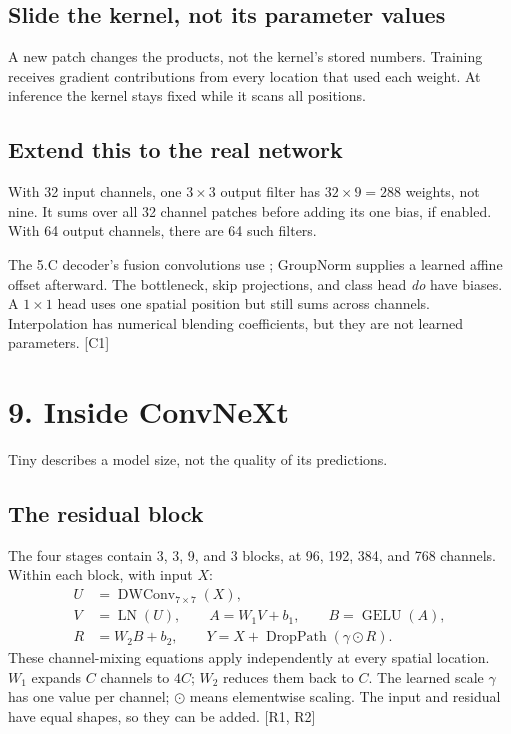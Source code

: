 \documentclass[11pt,letterpaper]{article}
\newcommand{\code}[1]{\texttt{\detokenize{#1}}}
\newcommand{\guidepage}[2]{\clearpage\pdfbookmark[0]{#1}{guide-\thepage}\section*{#1}{\sffamily\color{muted}#2}\par\vspace{5pt}}
\newcommand{\op}[1]{\operatorname{#1}}
\begin{document}
\subsection*{Slide the kernel, not its parameter values}
\begin{center}
\end{center}
A new patch changes the products, not the kernel's stored numbers. Training receives gradient contributions from every location that used each weight. At inference the kernel stays fixed while it scans all positions.

\subsection*{Extend this to the real network}
With 32 input channels, one $3\times3$ output filter has $32\times9=288$ weights, not nine. It sums over all 32 channel patches before adding its one bias, if enabled. With 64 output channels, there are 64 such filters.

The 5.C decoder's fusion convolutions use \code{bias=False}; GroupNorm supplies a learned affine offset afterward. The bottleneck, skip projections, and class head \emph{do} have biases. A $1\times1$ head uses one spatial position but still sums across channels. Interpolation has numerical blending coefficients, but they are not learned parameters. [C1]

\guidepage{9. Inside ConvNeXt}{Tiny describes a model size, not the quality of its predictions.}
\subsection*{The residual block}
The four stages contain 3, 3, 9, and 3 blocks, at 96, 192, 384, and 768 channels. Within each block, with input $X$:
\begin{align*}
U&=\op{DWConv}_{7\times7}(X),\\
V&=\op{LN}(U),\qquad A=W_1V+b_1,\qquad B=\op{GELU}(A),\\
R&=W_2B+b_2,\qquad Y=X+\op{DropPath}(\gamma\odot R).
\end{align*}
These channel-mixing equations apply independently at every spatial location. $W_1$ expands $C$ channels to $4C$; $W_2$ reduces them back to $C$. The learned scale $\gamma$ has one value per channel; $\odot$ means elementwise scaling. The input and residual have equal shapes, so they can be added. [R1, R2]
\end{document}
